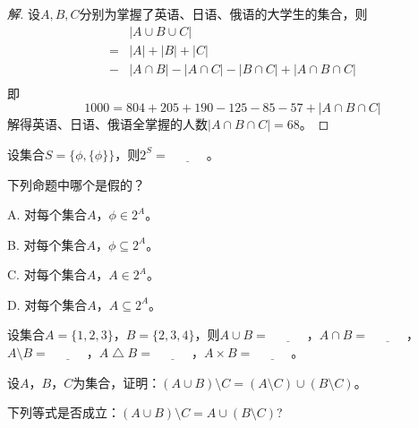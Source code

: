 \begin{proof}[解]
  设$A,B,C$分别为掌握了英语、日语、俄语的大学生的集合，则
  \begin{equation*}
    \begin{split}
      &|A \cup B \cup C|\\
      = &|A| + |B| + |C|\\
      - & |A \cap B| - |A \cap C| - |B \cap C| + |A \cap B \cap C|\\
    \end{split}
  \end{equation*}
  即
  \begin{equation*}
    1000 = 804 + 205 + 190 - 125 - 85 - 57 +  |A \cap B \cap C|
  \end{equation*}
  解得英语、日语、俄语全掌握的人数$|A \cap B \cap C|=68$。
\end{proof}
    \begin{Exercise}
   设集合$S=\{\phi, \{\phi\}\}$，则$2^S=\underline{\quad\quad\quad}$。
  \end{Exercise}
  \begin{Exercise}
    下列命题中哪个是假的？

    A. 对每个集合$A$，$\phi \in 2^A$。

    B. 对每个集合$A$，$\phi \subseteq 2^A$。

    C. 对每个集合$A$，$A \in 2^A$。

    D. 对每个集合$A$，$A \subseteq 2^A$。
  \end{Exercise}
  \begin{Exercise}
    设集合$A=\{1,2,3\}$，$B=\{2,3,4\}$，则$A\cup B=\underline{\quad\quad\quad}$，$A\cap B=\underline{\quad\quad\quad}$，$A\setminus B=\underline{\quad\quad\quad}$，$A\bigtriangleup B=\underline{\quad\quad\quad}$，$A\times B=\underline{\quad\quad\quad}$。
  \end{Exercise}
  \begin{Exercise}
   设$A$，$B$，$C$为集合，证明：$(A\cup B) \setminus C = (A\setminus C) \cup
   (B\setminus C)$。
 \end{Exercise}
    \begin{Exercise}
      下列等式是否成立：$(A\cup B) \setminus C = A \cup (B\setminus C)$?
    \end{Exercise}

